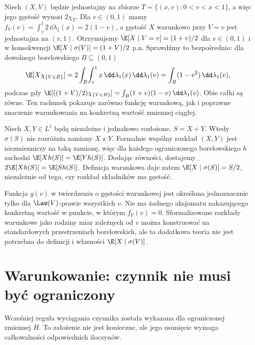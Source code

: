 \begin{przyklad}
Niech $(X,V)$ będzie jednostajny na zbiorze
$T=\{(x,v):0<v<x<1\}$, a więc jego gęstość
wynosi $2\chi_{T}$. Dla $v\in(0,1)$ mamy
$f_V(v)=\int_v^1 2\,\dd\lambda_1(x)=2(1-v)$,
a gęstość $X$ warunkowo przy $V=v$ jest
jednostajna na $(v,1)$. Otrzymujemy
$\E[X\mid V=v]=(1+v)/2$ dla $v\in(0,1)$
i w konsekwencji
$\E[X\mid\sigma(V)]=(1+V)/2$ p.n.
Sprawdźmy to bezpośrednio: dla dowolnego
borelowskiego $B\subseteq(0,1)$
\[
\E[X\chi_{\{V\in B\}}]
=2\int_B\!\int_v^1 x\,\dd\lambda_1(x)
\,\dd\lambda_1(v)
=\int_B(1-v^2)\,\dd\lambda_1(v),
\]
podczas gdy
$\E[((1+V)/2)\chi_{\{V\in B\}}]
=\int_B (1+v)(1-v)\,\dd\lambda_1(v)$.
Obie całki są równe. Ten rachunek pokazuje
zarówno funkcję warunkową, jak i poprawne znaczenie
warunkowania na konkretną wartość zmiennej ciągłej.
\end{przyklad}

\begin{przyklad}
Niech $X,Y\in L^1$ będą niezależne i jednakowo
rozłożone, $S=X+Y$. Wtedy $\sigma(S)$
nie rozróżnia zamiany $X$ z $Y$. Formalnie
wspólny rozkład $(X,Y)$ jest niezmienniczy na taką
zamianę, więc dla każdego ograniczonego
borelowskiego $h$ zachodzi
$\E[Xh(S)]=\E[Yh(S)]$.
Dodając równości, dostajemy
$2\E[Xh(S)]=\E[Sh(S)]$. Definicja warunkowa
daje zatem $\E[X\mid\sigma(S)]=S/2$,
niezależnie od tego, czy rozkład składników ma gęstość.
\end{przyklad}

\begin{uwaga}
Funkcja $g(v)$ w twierdzeniu o gęstości warunkowej
jest określona jednoznacznie tylko dla
$\Law(V)$-prawie wszystkich $v$. Nie ma żadnego
aksjomatu nakazującego konkretną wartość w punkcie,
w którym $f_V(v)=0$. Sformalizowane rozkłady
warunkowe jako rodziny miar zależnych od $v$
można konstruować na standardowych przestrzeniach
borelowskich, ale ta dodatkowa teoria nie jest
potrzebna do definicji i własności
$\E[X\mid\sigma(V)]$.
\end{uwaga}

\section{Warunkowanie: czynnik nie musi być ograniczony}

Wcześniej reguła wyciągania czynnika została wykazana dla
ograniczonej zmiennej $H$. To założenie nie jest konieczne, ale jego
usunięcie wymaga całkowalności odpowiednich iloczynów.

